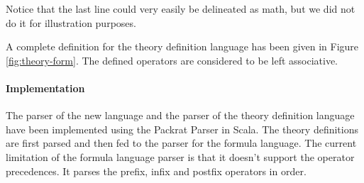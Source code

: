 Notice that the last line could very easily be delineated as math, but we did not do it
for illustration purposes.

A complete definition for the theory definition language has been given in Figure
\ref{fig:theory-form}. The defined operators are considered to be left associative.

\paragraph{Implementation} The parser of the new language and the parser of the theory
definition language have been implemented using the Packrat Parser \cite{packrat} in
Scala. The theory definitions are first parsed and then fed to the parser for the formula
language.  The current limitation of the formula language parser is that it doesn't
support the operator precedences. It parses the prefix, infix and postfix operators in
order.


